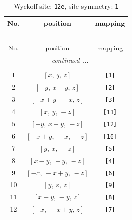 \documentclass[fleqn,8pt]{jsarticle}
\begin{document}
\begin{longtable}{ccc}
\caption{Wyckoff site: {\tt 12e}, site symmetry: {\tt 1}}
 \\
 \hline \hline
No. & position & mapping \\ \hline \endfirsthead

\multicolumn{2}{l}{\tablename\ \thetable{}} \\
 \hline \hline
No. & position & mapping \\ \hline \endhead

 \hline \hline
\multicolumn{2}{r}{\footnotesize\it continued ...} \\ \endfoot

 \hline \hline
\multicolumn{2}{r}{} \\ \endlastfoot

1 & $\left[ x,\, y,\, z \right]$ & {\tt [1]} \\ \hline
2 & $\left[ - y,\, x - y,\, z \right]$ & {\tt [2]} \\ \hline
3 & $\left[ - x + y,\, - x,\, z \right]$ & {\tt [3]} \\ \hline
4 & $\left[ x,\, y,\, - z \right]$ & {\tt [11]} \\ \hline
5 & $\left[ - y,\, x - y,\, - z \right]$ & {\tt [12]} \\ \hline
6 & $\left[ - x + y,\, - x,\, - z \right]$ & {\tt [10]} \\ \hline
7 & $\left[ y,\, x,\, - z \right]$ & {\tt [5]} \\ \hline
8 & $\left[ x - y,\, - y,\, - z \right]$ & {\tt [4]} \\ \hline
9 & $\left[ - x,\, - x + y,\, - z \right]$ & {\tt [6]} \\ \hline
10 & $\left[ y,\, x,\, z \right]$ & {\tt [9]} \\ \hline
11 & $\left[ x - y,\, - y,\, z \right]$ & {\tt [8]} \\ \hline
12 & $\left[ - x,\, - x + y,\, z \right]$ & {\tt [7]} \\
\end{longtable}
\end{document}
